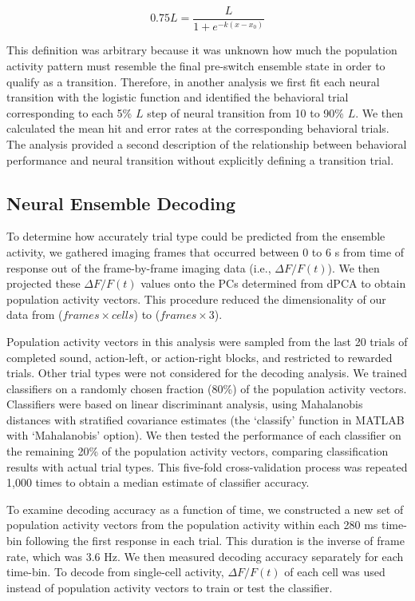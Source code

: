 \begin{equation*}
0.75L = \frac{L}{1+e^{-k(x-x_0)}}
\end{equation*}

This definition was arbitrary because it was unknown how much the population activity pattern must resemble the final pre-switch ensemble state in order to qualify as a transition. Therefore, in another analysis we first fit each neural transition with the logistic function and identified the behavioral trial corresponding to each 5\% $L$ step of neural transition from 10 to 90\% $L$. We then calculated the mean hit and error rates at the corresponding behavioral trials. The analysis provided a second description of the relationship between behavioral performance and neural transition without explicitly defining a transition trial.

\subsection*{Neural Ensemble Decoding}
To determine how accurately trial type could be predicted from the ensemble activity, we gathered imaging frames that occurred between 0 to 6 s from time of response out of the frame-by-frame imaging data (i.e., $\Delta F/F (t)$). We then projected these $\Delta F/F (t)$ values onto the PCs determined from dPCA to obtain population activity vectors. This procedure reduced the dimensionality of our data from ($frames \times cells$) to ($frames \times 3$). 

Population activity vectors in this analysis were sampled from the last 20 trials of completed sound, action-left, or action-right blocks, and restricted to rewarded trials. Other trial types were not considered for the decoding analysis. We trained classifiers on a randomly chosen fraction (80\%) of the population activity vectors. Classifiers were based on linear discriminant analysis, using Mahalanobis distances with stratified covariance estimates (the `classify' function in MATLAB with `Mahalanobis' option). We then tested the performance of each classifier on the remaining 20\% of the population activity vectors, comparing classification results with actual trial types. This five-fold cross-validation process was repeated 1,000 times to obtain a median estimate of classifier accuracy. 

To examine decoding accuracy as a function of time, we constructed a new set of population activity vectors from the population activity within each 280 ms time-bin following the first response in each trial. This duration is the inverse of frame rate, which was 3.6 Hz. We then measured decoding accuracy separately for each time-bin. To decode from single-cell activity, $\Delta F/F (t)$ of each cell was used instead of population activity vectors to train or test the classifier.

